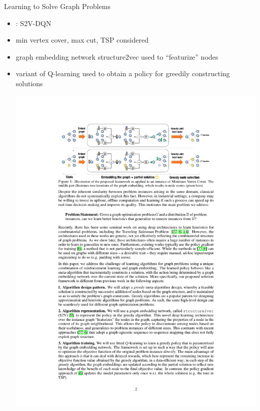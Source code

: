 \documentclass[aspectratio=1610]{beamer}
\newcommand{\important}[1]{{\color{green!60!black}#1}}
\begin{document}
\begin{frame}{Learning to Solve Graph Problems}
	\begin{itemize}
		\itemsep2ex
		\item {}: \important{S2V-DQN}
		\item min vertex cover, max cut, TSP considered 
		\item graph embedding network \important{structure2vec} used to ``featurize'' nodes
		\item variant of Q-learning used to obtain a policy for greedily constructing solutions
		\begin{center}
			\includegraphics[width=1\linewidth]{graphics/dai}
		\end{center}
	\end{itemize}
\end{frame}
\end{document}
